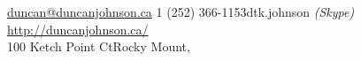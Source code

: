 
\noindent\href{mailto:duncan@duncanjohnson.ca}{duncan@duncanjohnson.ca}\bull %
\textsmaller{+}1 (252) 366-1153\bull dtk.johnson \textit{(Skype)}\bull %
\href{http://duncanjohnson.ca/}{http://duncanjohnson.ca/}\\ %
100 Ketch Point Ct\bull Rocky Mount, \bull {} %


